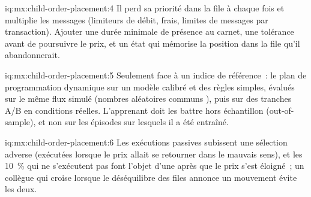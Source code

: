\begin{solution}{iq:mx:child-order-placement:4}
Il perd sa priorité dans la file à chaque fois et multiplie les messages (limiteurs de débit, frais, limites de messages par transaction). Ajouter une durée minimale de présence au carnet, une tolérance avant
de poursuivre le prix, et un état qui mémorise la position dans la file qu'il abandonnerait.
\end{solution}

\begin{solution}{iq:mx:child-order-placement:5}
Seulement face à un indice de référence~: le plan de programmation dynamique sur un modèle calibré et des règles simples, évalués sur le même flux simulé (nombres aléatoires communs
), puis sur des tranches A/B en conditions réelles. L'apprenant doit les battre hors échantillon (out-of-sample), et non sur les épisodes sur lesquels il a été entraîné.
\end{solution}

\begin{solution}{iq:mx:child-order-placement:6}
Les exécutions passives subissent une sélection adverse (exécutées lorsque le prix allait se retourner dans le mauvais sens), et les 10~\% qui ne s'exécutent pas font l'objet d'une  après que le
prix s'est éloigné~; un collègue qui croise lorsque le déséquilibre des files annonce un mouvement évite les deux.
\end{solution}

